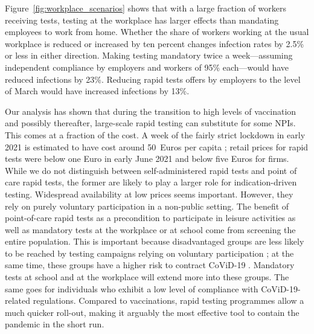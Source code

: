 Figure~\ref{fig:workplace_scenarios} shows that with a large fraction of workers
receiving tests, testing at the workplace has larger effects than mandating employees to
work from home. Whether the share of workers working at the usual workplace is reduced
or increased by ten percent changes infection rates by 2.5\% or less in either
direction. Making testing mandatory twice a week---assuming independent compliance by
employers and workers of 95\% each---would have reduced infections by 23\%. Reducing
rapid tests offers by employers to the level of March would have increased infections by
13\%.

Our analysis has shown that during the transition to high levels of vaccination and
possibly thereafter, large-scale rapid testing can substitute for some NPIs. This comes
at a fraction of the cost. A week of the fairly strict lockdown in early 2021 is
estimated to have cost around 50~Euros per capita \citep{Wollmershauser2021}; retail
prices for rapid tests were below one Euro in early June 2021 and below five Euros for
firms. While we do not distinguish between self-administered rapid tests and point of
care rapid tests, the former are likely to play a larger role for indication-driven
testing. Widespread availability at low prices seems important. However, they rely on
purely voluntary participation in a non-public setting. The benefit of point-of-care
rapid tests as a precondition to participate in leisure activities as well as mandatory
tests at the workplace or at school come from screening the entire population. This is
important because disadvantaged groups are less likely to be reached by testing
campaigns relying on voluntary participation \citep[e.g.][]{StillmanTonin2021}; at the
same time, these groups have a higher risk to contract CoViD-19
\citep{KochInstitut2021a}. Mandatory tests at school and at the workplace will extend
more into these groups. The same goes for individuals who exhibit a low level of
compliance with CoViD-19-related regulations. Compared to vaccinations, rapid testing
programmes allow a much quicker roll-out, making it arguably the most effective tool to
contain the pandemic in the short run.
